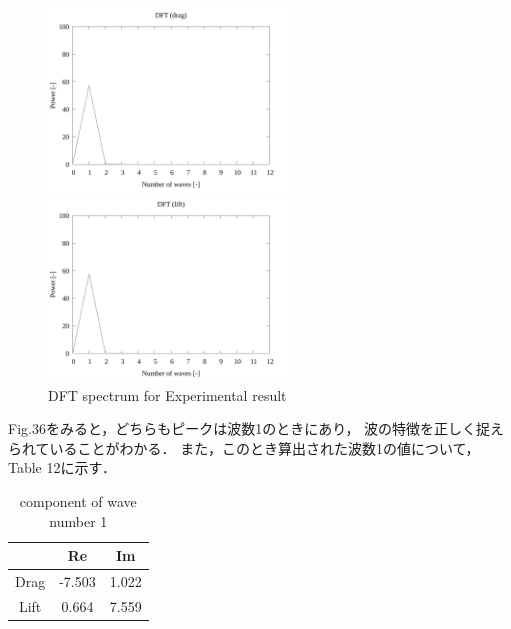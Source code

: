 \begin{figure}
  \begin{minipage}[b]{0.45\linewidth}
    \centering
    \includegraphics[width=65mm]{../../02_workspace/result/2-ex/plot/07/07-3_dft-drag.png}
  \end{minipage}
  \begin{minipage}[b]{0.45\linewidth}
    \centering
    \includegraphics[width=65mm]{../../02_workspace/result/2-ex/plot/07/07-4_dft-lift.png}
  \end{minipage}
  \caption{DFT spectrum for Experimental result}
\end{figure}

Fig.36をみると，どちらもピークは波数1のときにあり，
波の特徴を正しく捉えられていることがわかる．
また，このとき算出された波数1の値について，Table 12に示す．

\begin{table}[htbp]
  \begin{center}
    \caption{component of wave number 1}
    \begin{tabular}{|p{30mm}|p{20mm}|p{20mm}|}
      \hline
      \multicolumn{1}{|c|}{}     & \multicolumn{1}{|c|}{Re}     & \multicolumn{1}{|c|}{Im}    \\ \hline
      \multicolumn{1}{|c|}{Drag} & \multicolumn{1}{|c|}{-7.503} & \multicolumn{1}{|c|}{1.022} \\ \hline
      \multicolumn{1}{|c|}{Lift} & \multicolumn{1}{|c|}{0.664}  & \multicolumn{1}{|c|}{7.559} \\ \hline
    \end{tabular}
  \end{center}
\end{table}

